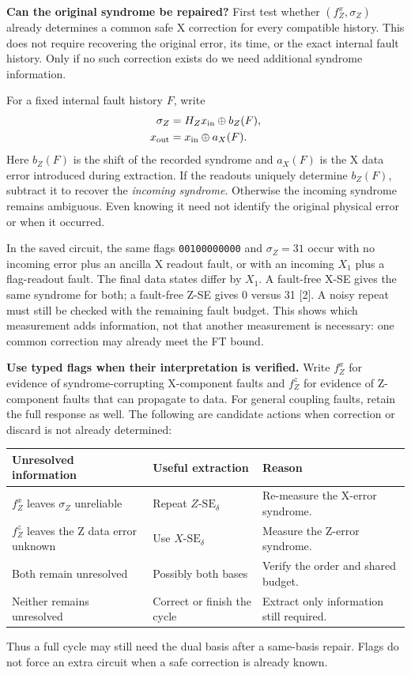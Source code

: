 \documentclass[11pt,a4paper]{article}
\newcommand{\SE}[2]{\ensuremath{#1\text{-}\mathrm{SE}_{#2}}}
\begin{document}
\textbf{Can the original syndrome be repaired?}
First test whether $(f_Z^x,\sigma_Z)$ already determines a common safe X
correction for every compatible history. This does not require recovering
the original error, its time, or the exact internal fault history.
Only if no such correction exists do we need additional syndrome information.

For a fixed internal fault history $F$, write
\begin{align*}
 \sigma_Z&=H_Zx_{\rm in}\oplus b_Z(F),\\
 x_{\rm out}&=x_{\rm in}\oplus a_X(F).
\end{align*}
Here $b_Z(F)$ is the shift of the recorded syndrome and $a_X(F)$ is the X
data error introduced during extraction. If the readouts uniquely determine
$b_Z(F)$, subtract it to recover the \emph{incoming syndrome}. Otherwise
the incoming syndrome remains ambiguous. Even knowing it need not identify
the original physical error or when it occurred.

In the saved circuit, the same flags \texttt{00100000000} and $\sigma_Z=31$
occur with no incoming error plus an ancilla X readout fault, or with an
incoming $X_1$ plus a flag-readout fault. The final data states differ by
$X_1$. A fault-free X-SE gives the same syndrome for both; a fault-free Z-SE
gives 0 versus 31 [2]. A noisy repeat must still be checked with the remaining
fault budget. This shows which measurement adds information, not that another
measurement is necessary: one common correction may already meet the FT bound.

\textbf{Use typed flags when their interpretation is verified.}
Write $f_Z^x$ for evidence of syndrome-corrupting X-component faults and
$f_Z^z$ for evidence of Z-component faults that can propagate to data.
For general coupling faults, retain the full response as well.
The following are candidate actions when correction or discard is not
already determined:

\begin{center}
\renewcommand{\arraystretch}{1.3}
\begin{tabular}{@{}p{4.4cm}p{5.2cm}p{5.8cm}@{}}
\textbf{Unresolved information} & \textbf{Useful extraction} & \textbf{Reason}\\
\hline
$f_Z^x$ leaves $\sigma_Z$ unreliable & Repeat \SE{Z}{\delta} & Re-measure the X-error syndrome.\\
$f_Z^z$ leaves the Z data error unknown & Use \SE{X}{\delta} & Measure the Z-error syndrome.\\
Both remain unresolved & Possibly both bases & Verify the order and shared budget.\\
Neither remains unresolved & Correct or finish the cycle & Extract only information still required.
\end{tabular}
\end{center}
Thus a full cycle may still need the dual basis after a same-basis repair.
Flags do not force an extra circuit when a safe correction is already known.
\end{document}
